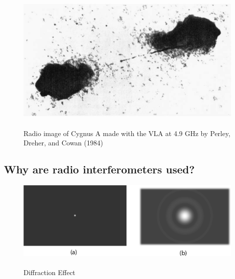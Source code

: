 \begin{figure}[htbp]

  \begin{center}
    \includegraphics[scale= 0.75]{Figures/cynus_A}
  \end{center}
  
 	\caption[Cygnus A]{\\Radio image of Cygnus A made with the VLA at 4.9 GHz by Perley, Dreher,
and Cowan (1984)~\citep[Pg.~33,~Fig.~1.18]{thompson2008interferometry}}
	\label{fig:CygnusA}
	
\end{figure}
\subsection{Why are radio interferometers used?}
\label{sec:intReason}
\begin{figure}[hbp]

  \begin{center}
    \includegraphics[scale= 1]{Figures/AntennaDif}
  \end{center}
  
 	\caption[Diffraction Effect]{\\Diffraction Effect~\citep[Appendix~B.1,~Fig.~B.1]{woods2010accelerating}}
	\label{fig:DifPat}
\end{figure}

